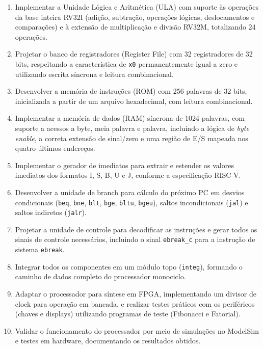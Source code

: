 \documentclass[
	12pt,				%
	oneside,
	a4paper,			%
	english,			%
	french,				%
	spanish,			%
	brazil,				%
	]{abntex2}
\begin{document}
\begin{enumerate}
  \item Implementar a Unidade Lógica e Aritmética (ULA) com suporte às operações da base inteira RV32I (adição, subtração, operações lógicas, deslocamentos e comparações) e à extensão de multiplicação e divisão RV32M, totalizando 24 operações.
  \item Projetar o banco de registradores (Register File) com 32 registradores de 32 bits, respeitando a característica de \texttt{x0} permanentemente igual a zero e utilizando escrita síncrona e leitura combinacional.
  \item Desenvolver a memória de instruções (ROM) com 256 palavras de 32 bits, inicializada a partir de um arquivo hexadecimal, com leitura combinacional.
  \item Implementar a memória de dados (RAM) síncrona de 1024 palavras, com suporte a acessos a byte, meia palavra e palavra, incluindo a lógica de \textit{byte enable}, a correta extensão de sinal/zero e uma região de E/S mapeada nos quatro últimos endereços.
  \item Implementar o gerador de imediatos para extrair e estender os valores imediatos dos formatos I, S, B, U e J, conforme a especificação RISC-V.
  \item Desenvolver a unidade de branch para cálculo do próximo PC em desvios condicionais (\texttt{beq}, \texttt{bne}, \texttt{blt}, \texttt{bge}, \texttt{bltu}, \texttt{bgeu}), saltos incondicionais (\texttt{jal}) e saltos indiretos (\texttt{jalr}).
  \item Projetar a unidade de controle para decodificar as instruções e gerar todos os sinais de controle necessários, incluindo o sinal \texttt{ebreak\_c} para a instrução de sistema \texttt{ebreak}.
  \item Integrar todos os componentes em um módulo topo (\texttt{integ}), formando o caminho de dados completo do processador monociclo.
  \item Adaptar o processador para síntese em FPGA, implementando um divisor de clock para operação em bancada, e realizar testes práticos com os periféricos (chaves e displays) utilizando programas de teste (Fibonacci e Fatorial).
  \item Validar o funcionamento do processador por meio de simulações no ModelSim e testes em hardware, documentando os resultados obtidos.
\end{enumerate}

\end{document}
